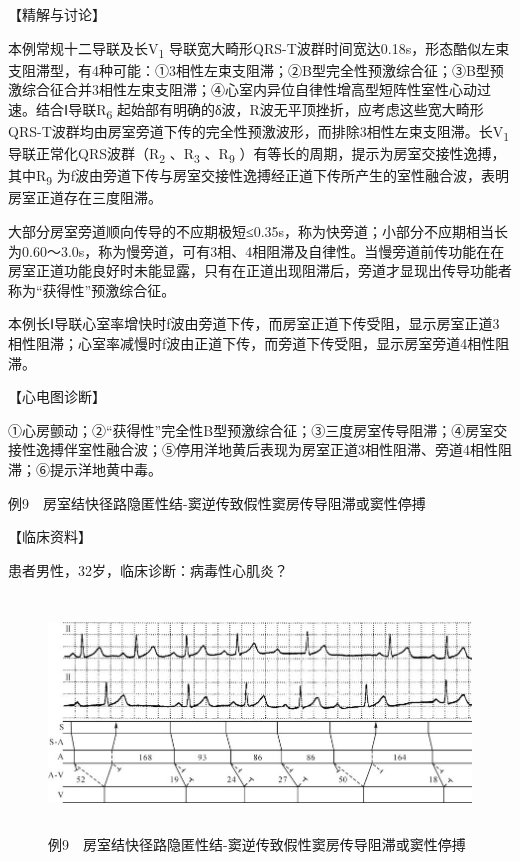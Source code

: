 【精解与讨论】

本例常规十二导联及长V\textsubscript{1}
导联宽大畸形QRS-T波群时间宽达0.18s，形态酷似左束支阻滞型，有4种可能：①3相性左束支阻滞；②B型完全性预激综合征；③B型预激综合征合并3相性左束支阻滞；④心室内异位自律性增高型短阵性室性心动过速。结合Ⅰ导联R\textsubscript{6}
起始部有明确的δ波，R波无平顶挫折，应考虑这些宽大畸形QRS-T波群均由房室旁道下传的完全性预激波形，而排除3相性左束支阻滞。长V\textsubscript{1}
导联正常化QRS波群（R\textsubscript{2} 、R\textsubscript{3}
、R\textsubscript{9}
）有等长的周期，提示为房室交接性逸搏，其中R\textsubscript{9}
为f波由旁道下传与房室交接性逸搏经正道下传所产生的室性融合波，表明房室正道存在三度阻滞。

大部分房室旁道顺向传导的不应期极短≤0.35s，称为快旁道；小部分不应期相当长为0.60～3.0s，称为慢旁道，可有3相、4相阻滞及自律性。当慢旁道前传功能在在房室正道功能良好时未能显露，只有在正道出现阻滞后，旁道才显现出传导功能者称为“获得性”预激综合征。

本例长Ⅰ导联心室率增快时f波由旁道下传，而房室正道下传受阻，显示房室正道3相性阻滞；心室率减慢时f波由正道下传，而旁道下传受阻，显示房室旁道4相性阻滞。

【心电图诊断】

①心房颤动；②“获得性”完全性B型预激综合征；③三度房室传导阻滞；④房室交接性逸搏伴室性融合波；⑤停用洋地黄后表现为房室正道3相性阻滞、旁道4相性阻滞；⑥提示洋地黄中毒。

例9　房室结快径路隐匿性结-窦逆传致假性窦房传导阻滞或窦性停搏

【临床资料】

患者男性，32岁，临床诊断：病毒性心肌炎？

\begin{figure}[!htbp]
 \centering
 \includegraphics[width=5.78125in,height=2.45833in]{./images/Image00767.jpg}
 \captionsetup{justification=centering}
 \caption{例9　房室结快径路隐匿性结-窦逆传致假性窦房传导阻滞或窦性停搏}
 \label{fig50-9}
  \end{figure} 

